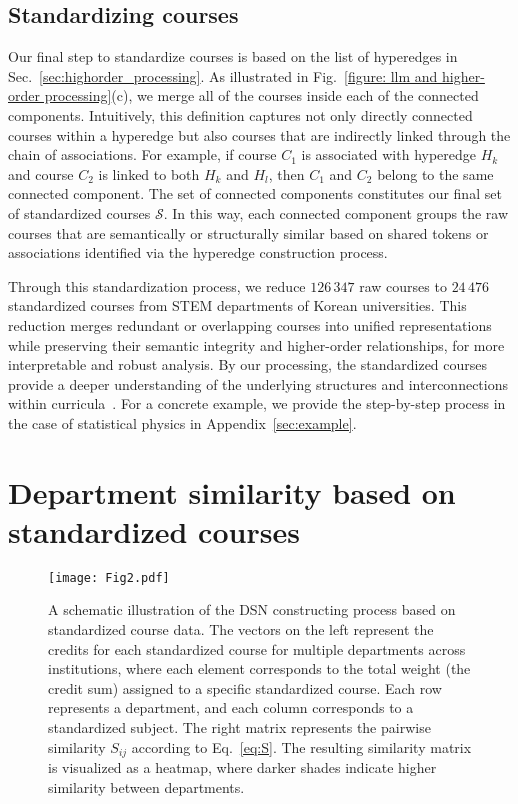 \documentclass{bmcart}
\begin{document}
\subsection{Standardizing courses}
\label{sec:Standardizing_Courses}

Our final step to standardize courses is based on the list of hyperedges in Sec.~\ref{sec:highorder_processing}. As illustrated in Fig.~\ref{figure: llm and higher-order processing}(c), we merge all of the courses inside each of the connected components.
Intuitively, this definition captures not only directly connected courses within a hyperedge but also courses that are indirectly linked through the chain of associations. For example, if course \( C_1 \) is associated with hyperedge \( H_k \) and course \( C_2 \) is linked to both \( H_k \) and \( H_l \), then \( C_1 \) and \( C_2 \) belong to the same connected component.
The set of connected components constitutes our final set of standardized courses \( \mathcal{S} \).
In this way, each connected component groups the raw courses that are semantically or structurally similar based on shared tokens or associations identified via the hyperedge construction process.

Through this standardization process, we reduce $126\,347$ raw courses to $24\,476$ standardized courses from STEM departments of Korean universities. This reduction merges redundant or overlapping courses into unified representations while preserving their semantic integrity and higher-order relationships, for more interpretable and robust analysis.
By our processing, the standardized courses provide a deeper understanding of the underlying structures and interconnections within curricula~\cite{Lemaire2006}.  
For a concrete example, we provide the step-by-step process in the case of statistical physics in 
Appendix~\ref{sec:example}. 

\section{Department similarity based on standardized courses}
\label{sec:DSN}

\begin{figure}
\centering 
\texttt{[image: Fig2.pdf]}
\caption{A schematic illustration of the DSN constructing process based on standardized course data.  
The vectors on the left represent the credits for each standardized course for multiple departments across institutions, where each element corresponds to the total weight (the credit sum) assigned to a specific standardized course. Each row represents a department, and each column corresponds to a standardized subject.  
The right matrix represents the pairwise similarity \( S_{ij} \) according to Eq.~\eqref{eq:S}.  
The resulting similarity matrix is visualized as a heatmap, where darker shades indicate higher similarity between departments.}
\label{figure: Schematic viz of processing-1}
\end{figure}
\end{document}
